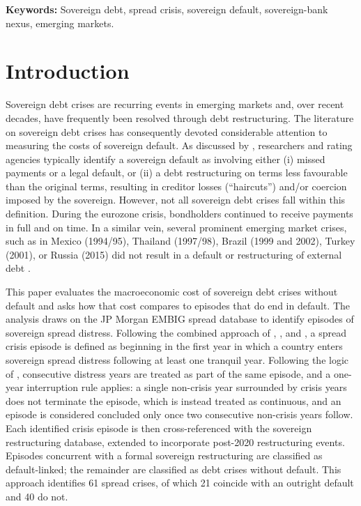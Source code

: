\documentclass[12pt]{article}
\begin{document}
\noindent\textbf{Keywords:} Sovereign debt, spread crisis, sovereign
default, sovereign-bank nexus, emerging markets.

\newpage

\section{Introduction}

Sovereign debt crises are recurring events in emerging markets and, over
recent decades, have frequently been resolved through debt restructuring.
The literature on sovereign debt crises has consequently devoted
considerable attention to measuring the costs of sovereign default. As
discussed by \citet{ams2019sovereign}, researchers and rating agencies typically
identify a sovereign default as involving either (i) missed payments or a
legal default, or (ii) a debt restructuring on terms less favourable than
the original terms, resulting in creditor losses (``haircuts'') and/or
coercion imposed by the sovereign. However, not all sovereign debt crises
fall within this definition. During the eurozone crisis, bondholders
continued to receive payments in full and on time. In a similar vein,
several prominent emerging market crises, such as in Mexico (1994/95),
Thailand (1997/98), Brazil (1999 and 2002), Turkey (2001), or Russia (2015)
did not result in a default or restructuring of external debt \citep{mitchener2021sovereign}.

This paper evaluates the macroeconomic cost of sovereign debt crises
without default and asks how that cost compares to episodes that do end in
default. The analysis draws on the JP Morgan EMBIG spread database to
identify episodes of sovereign spread distress. Following the combined
approach of \citet{pescatori2007adequately}, \citet{aguiar2016quantitative}, and
\citet{krishnamurthy2017credit}, a spread crisis episode is defined as
beginning in the first year in which a country enters sovereign spread
distress following at least one tranquil year. Following the logic of
\citet{detragiache2001crises}, consecutive distress years are treated
as part of the same episode, and a one-year interruption rule applies: a
single non-crisis year surrounded by crisis years does not terminate the
episode, which is instead treated as continuous, and an episode is
considered concluded only once two consecutive non-crisis years follow.
Each identified crisis episode is then cross-referenced with the \citet{asonuma2016sovereign} sovereign restructuring database, extended to
incorporate post-2020 restructuring events. Episodes concurrent with a
formal sovereign restructuring are classified as default-linked; the
remainder are classified as debt crises without default. This approach
identifies 61 spread crises, of which 21 coincide with an
outright default and 40 do not.
\end{document}
